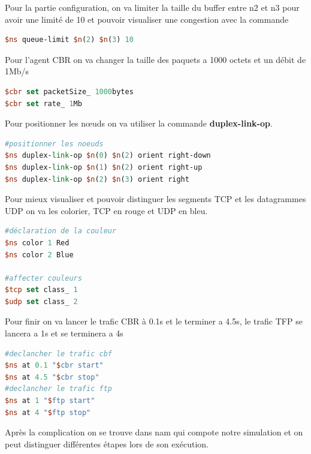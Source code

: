 \documentclass[11pt]{article}
\begin{document}
Pour la partie configuration, on va limiter la taille du buffer entre n2 et n3 pour avoir une limité de 10 et pouvoir visualiser une congestion  avec la commande 
\begin{lstlisting}[language=tcl, numbers=none, framexleftmargin=0pt, 	framextopmargin=0pt, framexbottommargin=0pt]
$ns queue-limit $n(2) $n(3) 10
\end{lstlisting}

Pour l'agent CBR on va changer la taille des paquets a 1000 octets et un débit de 1Mb/s
\begin{lstlisting}[language=tcl, numbers=none, framexleftmargin=0pt, 	framextopmargin=0pt, framexbottommargin=0pt]
$cbr set packetSize_ 1000bytes
$cbr set rate_ 1Mb
\end{lstlisting}

Pour positionner les nœuds on va utiliser la commande \textbf{duplex-link-op}.
\begin{lstlisting}[language=tcl, numbers=none, framexleftmargin=0pt, 	framextopmargin=0pt, framexbottommargin=0pt]
#positionner les noeuds
$ns duplex-link-op $n(0) $n(2) orient right-down
$ns duplex-link-op $n(1) $n(2) orient right-up
$ns duplex-link-op $n(2) $n(3) orient right
\end{lstlisting}

Pour mieux visualiser et pouvoir distinguer les segments TCP et les datagrammes UDP on va les colorier, TCP en rouge et UDP en bleu.
\begin{lstlisting}[language=tcl, numbers=none, framexleftmargin=0pt, 	framextopmargin=0pt, framexbottommargin=0pt]
#déclaration de la couleur
$ns color 1 Red
$ns color 2 Blue

#affecter couleurs
$tcp set class_ 1
$udp set class_ 2
\end{lstlisting}



Pour finir on va lancer le trafic CBR à 0.1s et le terminer a 4.5s, le trafic TFP se lancera a 1s et se terminera a 4s

\begin{lstlisting}[language=tcl, numbers=none, framexleftmargin=0pt, 	framextopmargin=0pt, framexbottommargin=0pt]
#declancher le trafic cbf
$ns at 0.1 "$cbr start"
$ns at 4.5 "$cbr stop"
#declancher le trafic ftp
$ns at 1 "$ftp start"
$ns at 4 "$ftp stop"
\end{lstlisting}


Après la complication on se trouve dans nam qui compote notre simulation et on peut distinguer différentes étapes lors de son exécution.
\end{document}
